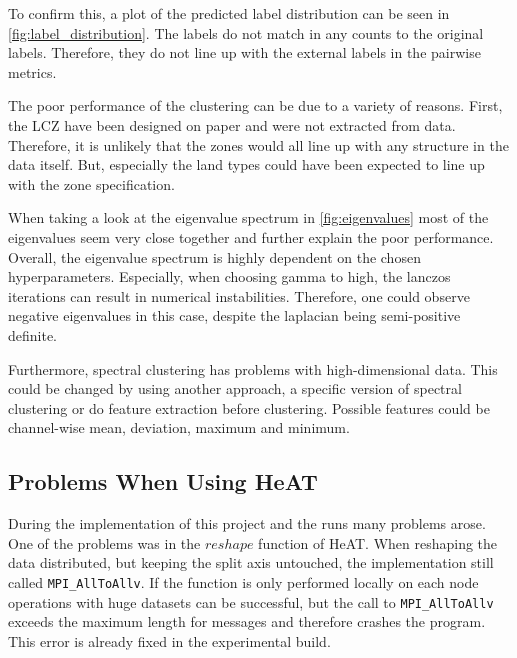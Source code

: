To confirm this, a plot of the predicted label distribution can be seen in \cref{fig:label_distribution}.
The labels do not match in any counts to the original labels. Therefore, they do not line up with the external labels
in the pairwise metrics.

The poor performance of the clustering can be due to a variety of reasons.
First, the \gls{LCZ} have been designed on paper and were not extracted from data. Therefore, it is unlikely that
the zones would all line up with any structure in the data itself.
But, especially the land types could have been expected to line up with the zone specification.

When taking a look at the eigenvalue spectrum in \cref{fig:eigenvalues} most of the eigenvalues seem very close together and
further explain the poor performance. Overall, the eigenvalue spectrum is highly dependent on the chosen hyperparameters.
Especially, when choosing gamma to high, the lanczos iterations can result in numerical instabilities.
Therefore, one could observe negative eigenvalues in this case, despite the laplacian being semi-positive definite.

Furthermore, spectral clustering has problems with high-dimensional data. This could be changed by using another approach, a specific version of spectral clustering
or do feature extraction before clustering. Possible features could be channel-wise mean, deviation, maximum and minimum.

\subsection{Problems When Using HeAT}
\label{subsec:problems_when_using_heat}
During the implementation of this project and the runs many problems arose.
One of the problems was in the \(reshape\) function of \gls{HeAT}.
When reshaping the data distributed, but keeping the split axis untouched, the implementation still called \lstinline{MPI_AllToAllv}.
If the function is only performed locally on each node operations with huge datasets can be successful, but the call to \lstinline{MPI_AllToAllv} exceeds the maximum length
for messages and therefore crashes the program.
This error is already fixed in the experimental build.

